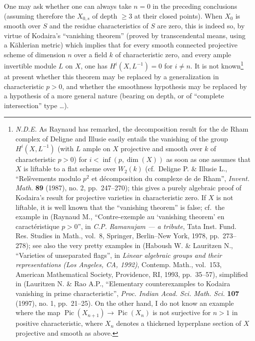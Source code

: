 \documentclass[
  11pt,
  a4paper,
]{book}
\begin{document}
One may ask whether one can always take \(n = 0\) in the preceding
conclusions (assuming therefore the \(X_{0,s}\) of depth \(\geqslant 3\)
at their closed points). When \(X_{0}\) is smooth over \(S\) and the
residue characteristics of \(S\) are zero, this is indeed so, by virtue
of Kodaira's ``vanishing theorem'' (proved by transcendental means,
using a Kählerian metric) which implies that for every smooth connected
projective scheme of dimension \(n\) over a field \(k\) of
characteristic zero, and every ample invertible module \(L\) on \(X\),
one has \(H^{i}(X, L^{-1}) = 0\) for \(i \neq n\). It is not
known\footnote{\emph{N.D.E.} As Raynaud has remarked, the decomposition
  result for the de Rham complex of Deligne and Illusie easily entails
  the vanishing of the group \(H^{i}(X, L^{-1})\) (with \(L\) ample on
  \(X\) projective and smooth over \(k\) of characteristic \(p > 0\))
  for \(i < \inf(p, \dim(X))\) as soon as one assumes that \(X\) is
  liftable to a flat scheme over \(W_{2}(k)\) (cf.~Deligne P. \& Illusie
  L., ``Relèvements modulo \(p^{2}\) et décomposition du complexe de de
  Rham'', \emph{Invent. Math.} \textbf{89} (1987), no. 2, pp.~247--270);
  this gives a purely algebraic proof of Kodaira's result for projective
  varieties in characteristic zero. If \(X\) is not liftable, it is well
  known that the ``vanishing theorem'' is false; cf.~the example in
  (Raynaud M., ``Contre-exemple au `vanishing theorem' en
  caractéristique \(p >
  0\)'', in \emph{C.P. Ramanujam --- a tribute}, Tata Inst. Fund. Res.
  Studies in Math., vol.~8, Springer, Berlin--New York, 1978,
  pp.~273--278); see also the very pretty examples in (Haboush W. \&
  Lauritzen N., ``Varieties of unseparated flags'', in \emph{Linear
  algebraic groups and their representations (Los Angeles, CA, 1992)},
  Contemp. Math., vol.~153, American Mathematical Society, Providence,
  RI, 1993, pp.~35--57), simplified in (Lauritzen N. \& Rao A.P.,
  ``Elementary counterexamples to Kodaira vanishing in prime
  characteristic'', \emph{Proc. Indian Acad. Sci. Math. Sci.}
  \textbf{107} (1997), no. 1, pp.~21--25). On the other hand, I do not
  know an example where the map \(\operatorname{Pic}(X_{n+1}) \to
  \operatorname{Pic}(X_{n})\) is not surjective for \(n > 1\) in
  positive characteristic, where \(X_{n}\) denotes a thickened
  hyperplane section of \(X\) projective and smooth as above.} at
present whether this theorem may be replaced by a generalization in
characteristic \(p > 0\), and whether the smoothness hypothesis may be
replaced by a hypothesis of a more general nature (bearing on depth, or
of ``complete intersection'' type \ldots).
\end{document}
